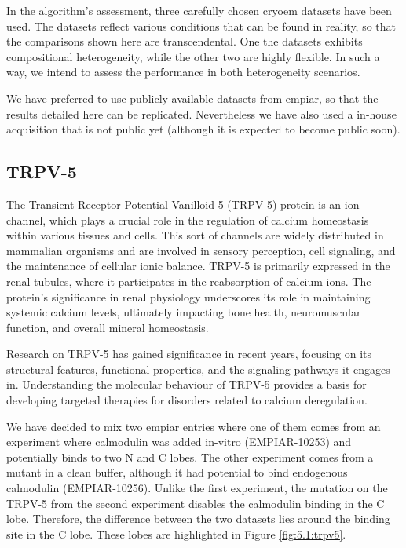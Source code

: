 \documentclass[../main.tex]{subfiles}
\begin{document}
In the algorithm's assessment, three carefully chosen \gls{cryoem} datasets have been used. The datasets reflect various conditions that can be found in reality, so that the comparisons shown here are transcendental. One the datasets exhibits compositional heterogeneity, while the other two are highly flexible. In such a way, we intend to assess the performance in both heterogeneity scenarios.

We have preferred to use publicly available datasets from \gls{empiar}, so that the results detailed here can be replicated. Nevertheless we have also used a in-house acquisition that is not public yet (although it is expected to become public soon).

\subsection{TRPV-5}
The Transient Receptor Potential Vanilloid 5 (TRPV-5) protein is an ion channel, which plays a crucial role in the regulation of calcium homeostasis within various tissues and cells. This sort of channels are widely distributed in mammalian organisms and are involved in sensory perception, cell signaling, and the maintenance of cellular ionic balance. TRPV-5 is primarily expressed in the renal tubules, where it participates in the reabsorption of calcium ions. The protein's significance in renal physiology underscores its role in maintaining systemic calcium levels, ultimately impacting bone health, neuromuscular function, and overall mineral homeostasis.

Research on TRPV-5 has gained significance in recent years, focusing on its structural features, functional properties, and the signaling pathways it engages in. Understanding the molecular behaviour of TRPV-5 provides a basis for developing targeted therapies for disorders related to calcium deregulation.

We have decided to mix two \gls{empiar} entries where one of them comes from an experiment where calmodulin was added in-vitro (EMPIAR-10253) and potentially binds to two N and C lobes. The other experiment comes from a mutant in a clean buffer, although it had potential to bind endogenous calmodulin (EMPIAR-10256). Unlike the first experiment, the mutation on the TRPV-5 from the second experiment disables the calmodulin binding in the C lobe. Therefore, the difference between the two datasets lies around the binding site in the C lobe\cite{zhou2022}\cite{dang2019}. These lobes are highlighted in Figure \ref{fig:5.1:trpv5}.
\end{document}
